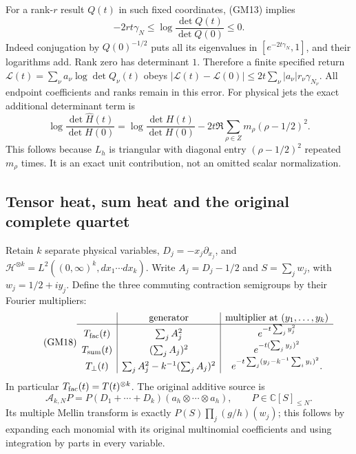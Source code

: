 For a rank-$r$ result $Q(t)$ in such fixed coordinates, (GM13) implies
\begin{equation}\tag{GM16}
 -2rt\gamma_N\leq\log\frac{\det Q(t)}{\det Q(0)}\leq0.
\end{equation}
Indeed conjugation by $Q(0)^{-1/2}$ puts all its eigenvalues in
$[e^{-2t\gamma_N},1]$, and their logarithms add.  Rank zero has
determinant $1$.  Therefore a finite specified return
$\mathcal L(t)=\sum_\nu a_\nu\log\det Q_\nu(t)$ obeys
$|\mathcal L(t)-\mathcal L(0)|
\leq2t\sum_\nu|a_\nu|r_\nu\gamma_{N_\nu}$.
All endpoint coefficients and ranks remain in this error.  For
physical jets the exact additional determinant term is
\begin{equation}\tag{GM17}
 \log\frac{\det\widehat H(t)}{\det H(0)}
 =\log\frac{\det H(t)}{\det H(0)}
       -2t\Re\sum_{\rho\in Z}m_\rho(\rho-1/2)^2.
\end{equation}
This follows because $L_h$ is triangular with diagonal entry
$(\rho-1/2)^2$ repeated $m_\rho$ times.  It is an exact unit
contribution, not an omitted scalar normalization.

\subsection{Tensor heat, sum heat and the original complete quartet}

Retain $k$ separate physical variables, $D_j=-x_j\partial_{x_j}$,
and $\mathcal H^{\otimes k}=L^2((0,\infty)^k,dx_1\cdots dx_k)$.
Write $A_j=D_j-1/2$ and $S=\sum_jw_j$, with
$w_j=1/2+iy_j$.  Define the three commuting contraction semigroups
by their Fourier multipliers:
\begin{equation}\tag{GM18}
 \begin{array}{c|c|c}
 &\text{generator}&\text{multiplier at }(y_1,\ldots,y_k)\\ \hline
 T_{\rm fac}(t)&\sum_jA_j^2&e^{-t\sum_jy_j^2}\\
 T_{\rm sum}(t)&(\sum_jA_j)^2&e^{-t(\sum_jy_j)^2}\\
 T_{\perp}(t)&\sum_jA_j^2-k^{-1}(\sum_jA_j)^2
                &e^{-t\sum_j(y_j-k^{-1}\sum_i y_i)^2}.
 \end{array}
\end{equation}
In particular $T_{\rm fac}(t)=T(t)^{\otimes k}$.  The original
additive source is
\[
 \mathcal A_{k,N}P
 =P(D_1+\cdots+D_k)(a_h\otimes\cdots\otimes a_h),
 \qquad P\in\mathbb C[S]_{\leq N}.
\]
Its multiple Mellin transform is exactly
$P(S)\prod_j(g/h)(w_j)$; this follows by expanding each monomial
with its original multinomial coefficients and using integration by
parts in every variable.

